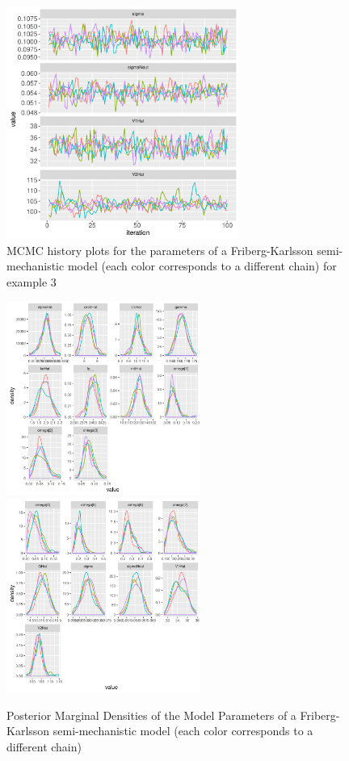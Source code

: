 \documentclass[11pt]{amsart}
\begin{document}
\begin{figure}[htbp]
\includegraphics[width=3.0in,trim=0in 0in 0 0in]{graphics/neutropenia_0.82/neutropeniaPopulationPlots004.pdf}
\caption{{MCMC history plots for the parameters of a Friberg-Karlsson semi-mechanistic model (each color corresponds to a different chain) for example 3}}
\label{FKMCMC}
\end{figure}

\begin{figure}[htbp]
\includegraphics[width=2.5in,trim=0in 0in 0 0in]{graphics/neutropenia_0.82/neutropeniaPopulationPlots005.pdf}
\includegraphics[width=2.5in,trim=0in 0in 0 0in]{graphics/neutropenia_0.82/neutropeniaPopulationPlots006.pdf}
\caption{{Posterior Marginal Densities of the Model Parameters of a Friberg-Karlsson semi-mechanistic model (each color corresponds to a different chain)}}
\label{FKDens}
\end{figure}
\end{document}
